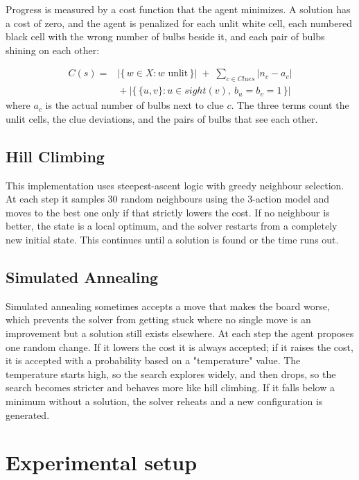 \documentclass[12pt]{report}
\begin{document}
Progress is measured by a cost function that the agent minimizes. A solution has a cost of zero, and the agent is penalized for each unlit white cell, each numbered black cell with the wrong number of bulbs beside it, and each pair of bulbs shining on each other:

\begin{align*}
  C(s) = {}& \bigl|\{\,w \in X : w \text{ unlit}\,\}\bigr|
           \;+\; \sum_{c \in \mathit{Clues}} |n_c - a_c| \\[2pt]
         &{} + \bigl|\bigl\{\,\{u,v\} : u \in \mathit{sight}(v),\ b_u = b_v = 1\,\bigr\}\bigr|
\end{align*}
where $a_c$ is the actual number of bulbs next to clue $c$. The three terms count the unlit cells, the clue deviations, and the pairs of bulbs that see each other.

\subsection{Hill Climbing}

This implementation uses steepest-ascent logic with greedy neighbour selection. At each step it samples 30 random neighbours using the 3-action model and moves to the best one only if that strictly lowers the cost. If no neighbour is better, the state is a local optimum, and the solver restarts from a completely new initial state. This continues until a solution is found or the time runs out. 

\subsection{Simulated Annealing}

Simulated annealing sometimes accepts a move that makes the board worse, which prevents the solver from getting stuck where no single move is an improvement but a solution still exists elsewhere. At each step the agent proposes one random change. If it lowers the cost it is always accepted; if it raises the cost, it is accepted with a probability based on a "temperature" value. The temperature starts high, so the search explores widely, and then drops, so the search becomes stricter and behaves more like hill climbing. If it falls below a minimum without a solution, the solver reheats and a new configuration is generated.

\newpage
\section{Experimental setup}
\label{sec:setup}
\end{document}
